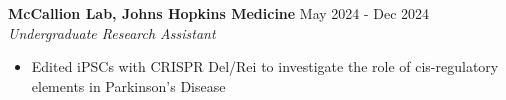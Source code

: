 \documentclass[11pt]{article}       %
\begin{document}

\textbf{McCallion Lab, Johns Hopkins Medicine} \hfill May 2024 - Dec 2024 \\
\textit{Undergraduate Research Assistant} \vspace{-9pt} \\
\begin{itemize}
  \item Edited iPSCs with CRISPR Del/Rei to investigate the role of cis-regulatory elements in Parkinson's Disease
\end{itemize}


\end{document}
